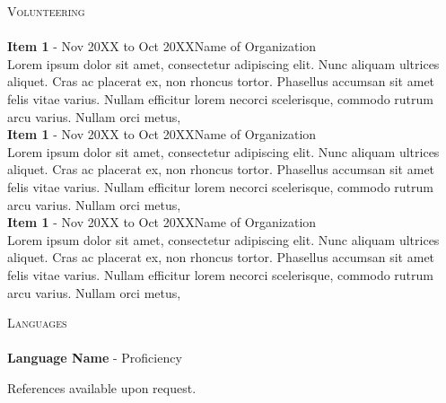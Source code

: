 \documentclass[a4paper]{article}
\newcommand{\lineunder} {
    \vspace*{-8pt} \\
    \hspace*{-18pt} \hrulefill \\
}
\newcommand{\header} [1] {
    {\hspace*{-18pt}\vspace*{6pt} \textsc{#1}}
    \vspace*{-6pt} \lineunder
}
\begin{document}
\header{Volunteering}
\vspace{1mm}
{\textbf{Item 1}} - Nov 20XX to Oct 20XX\hfill Name of Organization \\
Lorem ipsum dolor sit amet, consectetur adipiscing elit. Nunc aliquam ultrices aliquet. 
Cras ac placerat ex, non rhoncus tortor. Phasellus accumsan sit amet felis vitae varius. 
Nullam efficitur lorem necorci scelerisque, commodo rutrum arcu varius. Nullam orci metus,\\
\vspace*{2mm}
{\textbf{Item 1}} - Nov 20XX to Oct 20XX\hfill Name of Organization \\
Lorem ipsum dolor sit amet, consectetur adipiscing elit. Nunc aliquam ultrices aliquet. 
Cras ac placerat ex, non rhoncus tortor. Phasellus accumsan sit amet felis vitae varius. 
Nullam efficitur lorem necorci scelerisque, commodo rutrum arcu varius. Nullam orci metus,\\
\vspace*{2mm}
{\textbf{Item 1}} - Nov 20XX to Oct 20XX\hfill Name of Organization \\
Lorem ipsum dolor sit amet, consectetur adipiscing elit. Nunc aliquam ultrices aliquet. 
Cras ac placerat ex, non rhoncus tortor. Phasellus accumsan sit amet felis vitae varius. 
Nullam efficitur lorem necorci scelerisque, commodo rutrum arcu varius. Nullam orci metus,\\
\vspace*{2mm}

\header{Languages}
\vspace{1mm}
{\textbf{Language Name}} - Proficiency\\
\vspace*{2mm}

\vspace*{2mm}
References available upon request.
\end{document}
